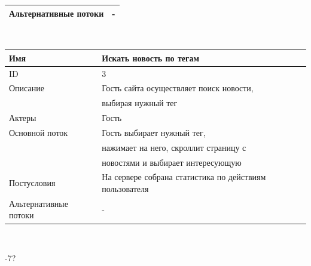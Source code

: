 \begin{center}
\begin{tabular}{|l|l|}
        \hline
        Альтернативные потоки & -                                                       \\
        \hline
    \end{tabular}\\
    \vspace{0.5cm}
    \begin{tabular}{|l|l|}
        \hline
        Имя                   & Искать новость по тегам                                 \\
        \hline
        ID                    & 3                                                       \\
        \hline
        Описание              & Гость сайта осуществляет поиск новости,                 \\
        & выбирая нужный тег                                      \\
        \hline
        Актеры                & Гость                                                   \\
        \hline
        Основной поток        & Гость выбирает нужный тег,                              \\
        & нажимает на него, скроллит страницу с                   \\
        & новостями и выбирает интересующую                       \\
        \hline
        Постусловия           & На сервере собрана статистика по действиям пользователя \\
        \hline
        Альтернативные потоки & -                                                       \\
        \hline
    \end{tabular}\\
\end{center}
\newpage
{}-7?
